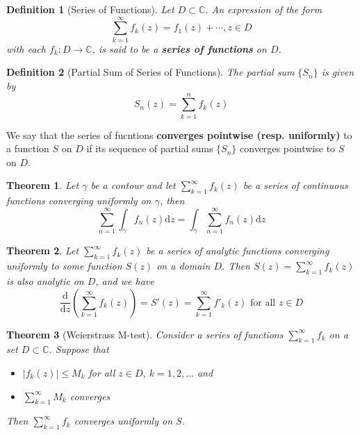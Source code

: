 \documentclass[12pt]{article}
\newcommand{\diff}{\mathrm{d}}
\newtheorem{definition}{Definition}[section]
\newtheorem{theorem}{Theorem}[section]
\theoremstyle{definition}
\begin{document}
\begin{definition}[Series of Functions]
\normalfont Let $D\subset \mathbb{C}$. An expression of the form 
\[
\sum_{k=1}^\infty f_k(z)=f_1(z)+\cdots, z\in D
\]
with each $f_k: D\to \mathbb{C}$, is said to be a \textbf{series of functions} on $D$.
\end{definition}
\begin{definition}[Partial Sum of Series of Functions]
\normalfont The partial sum $\{S_n\}$ is given by
\[
S_n(z)=\sum_{k=1}^n f_k(z)
\]
\end{definition}
We say that the series of fucntions \textbf{converges pointwise (resp. uniformly)} to a function $S$ on $D$ if its sequence of partial sums $\{S_n\}$ converges pointwise to $S$ on $D$.
\begin{theorem}\normalfont Let $\gamma$ be a contour and let $\sum_{k=1}^\infty f_k(z)$ be a series of continuous functions converging uniformly on $\gamma$, then
\[
\sum_{n=1}^\infty \int_\gamma f_n(z)\diff z = \int_\gamma \sum_{n=1}^\infty f_n(z)\diff z
\]
\end{theorem}
\begin{theorem}\normalfont Let $\sum_{k=1}^\infty f_k(z)$ be a series of analytic functions converging uniformly to some function $S(z)$ on a domain $D$. Then $S(z)=\sum_{k=1}^\infty f_k(z)$ is also analytic on $D$, and we have
\[
\frac{\diff }{\diff z}(\sum_{k=1}^\infty f_k(z))=S'(z)=\sum_{k=1}^\infty f'_k(z)\text{ for all }z\in D
\]
\end{theorem}
\begin{theorem}[Weierstrass M-test]
\normalfont Consider a series of functions $\sum_{k=1}^\infty f_k$ on a set $D\subset \mathbb{C}$. Suppose that
\begin{itemize}
	\item $|f_k(z)|\leq M_k$ for all $z\in D$, $k=1,2,\ldots $ and
	\item $\sum_{k=1}^\infty M_k$ converges
\end{itemize}
Then $\sum_{k=1}^\infty f_k$ converges uniformly on $S$.
\end{theorem}
\end{document}
